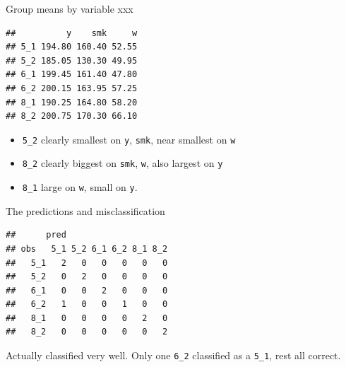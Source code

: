 \documentclass[ignorenonframetext,]{beamer}
\newenvironment{Shaded}{\begin{snugshade}}{\end{snugshade}}
\newcommand{\DataTypeTok}[1]{\textcolor[rgb]{0.13,0.29,0.53}{#1}}
\newcommand{\FloatTok}[1]{\textcolor[rgb]{0.00,0.00,0.81}{#1}}
\newcommand{\KeywordTok}[1]{\textcolor[rgb]{0.13,0.29,0.53}{\textbf{#1}}}
\newcommand{\NormalTok}[1]{#1}
\newcommand{\OperatorTok}[1]{\textcolor[rgb]{0.81,0.36,0.00}{\textbf{#1}}}
\newcommand{\StringTok}[1]{\textcolor[rgb]{0.31,0.60,0.02}{#1}}
\begin{document}
\begin{frame}[fragile]{Group means by variable xxx}
\protect\hypertarget{group-means-by-variable-xxx}{}

\begin{Shaded}
\end{Shaded}

\begin{verbatim}
##          y    smk     w
## 5_1 194.80 160.40 52.55
## 5_2 185.05 130.30 49.95
## 6_1 199.45 161.40 47.80
## 6_2 200.15 163.95 57.25
## 8_1 190.25 164.80 58.20
## 8_2 200.75 170.30 66.10
\end{verbatim}

\begin{itemize}
\item
  \texttt{5\_2} clearly smallest on \texttt{y}, \texttt{smk}, near
  smallest on \texttt{w}
\item
  \texttt{8\_2} clearly biggest on \texttt{smk}, \texttt{w}, also
  largest on \texttt{y}
\item
  \texttt{8\_1} large on \texttt{w}, small on \texttt{y}.
\end{itemize}

\end{frame}

\begin{frame}[fragile]{The predictions and misclassification}
\protect\hypertarget{the-predictions-and-misclassification}{}

\begin{Shaded}
\end{Shaded}

\begin{verbatim}
##      pred
## obs   5_1 5_2 6_1 6_2 8_1 8_2
##   5_1   2   0   0   0   0   0
##   5_2   0   2   0   0   0   0
##   6_1   0   0   2   0   0   0
##   6_2   1   0   0   1   0   0
##   8_1   0   0   0   0   2   0
##   8_2   0   0   0   0   0   2
\end{verbatim}

Actually classified very well. Only one \texttt{6\_2} classified as a
\texttt{5\_1}, rest all correct.

\end{frame}
\end{document}
